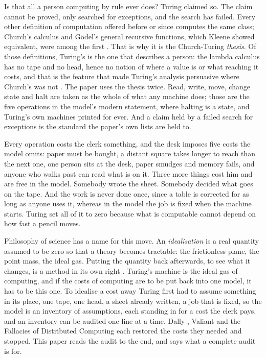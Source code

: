 \documentclass[11pt,oneside]{article}
\theoremstyle{definition}
\theoremstyle{remark}
\begin{document}
Is that all a person computing by rule ever does? Turing claimed so. The claim cannot be
proved, only searched for exceptions, and the search has failed. Every other definition of
computation offered before or since computes the same class; Church's calculus and Gödel's
general recursive functions, which Kleene showed equivalent, were among the first
\cite{church1936,kleene1936}. That is why it is the Church-Turing \emph{thesis}. Of those
definitions, Turing's is the one that describes a person: the lambda calculus has no tape
and no head, hence no notion of where a value is or what reaching it costs, and that is
the feature that made Turing's analysis persuasive where Church's was not
\cite{gandy1980,sieg1997,soare1996}. The paper uses the thesis twice. Read, write, move,
change state and halt are taken as the whole of what any machine does; those are the five
operations in the model's modern statement, where halting is a state, and Turing's own
machines printed for ever. And a claim held by a failed search for exceptions is the
standard the paper's own lists are held to.

Every operation costs the clerk something, and the desk imposes five costs the model
omits: paper must be bought, a distant square takes longer to reach than the next one,
one person sits at the desk, paper smudges and memory fails, and anyone who walks past can
read what is on it. Three more things cost him and are free in the model. Somebody wrote
the sheet. Somebody decided what goes on the tape. And the work is never done once, since
a table is corrected for as long as anyone uses it, whereas in the model the job is fixed
when the machine starts. Turing set all of it to zero because what is computable cannot
depend on how fast a pencil moves.

Philosophy of science has a name for this move. An \emph{idealisation} is a real quantity
assumed to be zero so that a theory becomes tractable: the frictionless plane, the point
mass, the ideal gas. Putting the quantity back afterwards, to see what it changes, is a
method in its own right \cite{mcmullin1985}. Turing's machine is the ideal gas of
computing, and if the costs of computing are to be put back into one model, it has to be
this one. To idealise a cost away Turing first had to assume something in its place, one
tape, one head, a sheet already written, a job that is fixed, so the model is an inventory
of assumptions, each standing in for a cost the clerk pays, and an inventory can be
audited one line at a time. Dally \cite{dally2022}, Valiant \cite{valiant1990} and the
Fallacies of Distributed Computing \cite{fallacies} each restored the costs they needed and
stopped. This paper reads the audit to the end, and says what a complete audit is for.
\end{document}
